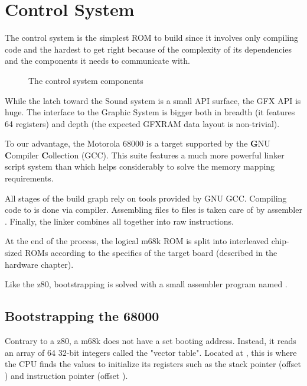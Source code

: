 \chapter{Control System}
The control system is the simplest ROM to build since it involves only compiling code and the hardest to get right because of the complexity of its dependencies and the components it needs to communicate with. 

\begin{figure}[H]
\caption*{The control system components}
\end{figure}

While the latch toward the Sound system is a small API surface, the GFX API is huge. The interface to the Graphic System is bigger both in breadth (it features 64 registers) and depth (the expected GFXRAM data layout is non-trivial).

To our advantage, the Motorola 68000 is a target supported by the \textbf{G}NU \textbf{C}ompiler \textbf{C}ollection (GCC). This suite features a much more powerful linker script system than  which helps considerably to solve the memory mapping requirements.

All stages of the build graph rely on tools provided by GNU GCC. Compiling  code to  is done via  compiler. Assembling  files to  files is taken care of by  assembler . Finally, the  linker combines all  together into raw instructions. 





At the end of the process, the logical m68k ROM is split into interleaved chip-sized ROMs according to the specifics of the target board (described in the hardware chapter).

Like the z80, bootstrapping is solved with a small assembler program named .

\section{Bootstrapping the 68000}
Contrary to a z80, a m68k does not have a set booting address. Instead, it reads an array of 64 32-bit integers called the "vector table". Located at , this is where the CPU finds the values to initialize its registers such as the stack pointer (offset ) and instruction pointer (offset ).

